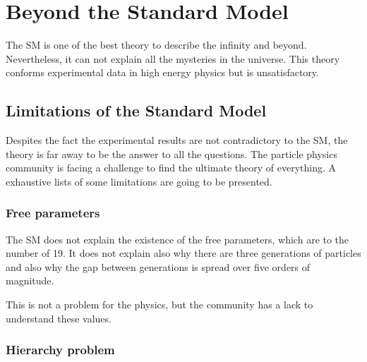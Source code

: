 
      
  \section{Beyond the Standard Model}

  The SM is one of the best theory to describe the infinity and beyond. 
  Nevertheless, it can not explain all the mysteries in the universe. 
  This theory conforms experimental data in high energy physics but is unsatisfactory.
  
  \subsection{Limitations of the Standard Model}

  Despites the fact the experimental results are not contradictory to the SM, the theory is far away to be the answer to all the questions.
  The particle physics community is facing a challenge to find the ultimate theory of everything.
  A exhaustive lists of some limitations are going to be presented.

    \subsubsection{Free parameters}

    The SM does not explain the existence of the free parameters, which are to the number of 19.
    It does not explain also why there are three generations of particles and also why the gap between generations is spread over five orders of magnitude.

    This is not a problem for the physics, but the community has a lack to understand these values.
  
    \subsubsection{Hierarchy problem}


